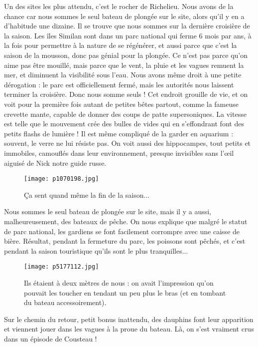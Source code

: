 \documentclass{book}
\begin{document}
Un des sites les plus attendu, c'est le rocher de Richelieu. Nous avons de la chance car nous sommes le seul bateau de plongée sur le site, alors qu'il y en a d'habitude une dizaine. Il se trouve que nous sommes sur la dernière croisière de la saison. Les îles Similan sont dans un parc national qui ferme 6 mois par ans, à la fois pour permettre à la nature de se régénérer, et aussi parce que c'est la saison de la mousson, donc pas génial pour la plongée. Ce n'est pas parce qu'on aime pas être mouillé, mais parce que le vent, la pluie et les vagues remuent la mer, et diminuent la visibilité sous l'eau. Nous avons même droit à une petite dérogation : le parc est officiellement fermé, mais les autorités nous laissent terminer la croisière. Donc nous somme seuls ! Cet endroit grouille de vie, et on voit pour la première fois autant de petites bêtes partout, comme la fameuse crevette mante, capable de donner des coups de patte supersoniques. La vitesse est telle que le mouvement crée des bulles de vides qui en s'effondrant font des petits flashs de lumière ! Il est même compliqué de la garder en aquarium : souvent, le verre ne lui résiste pas. On voit aussi des hippocampes, tout petits et immobiles, camouflés dans leur environnement, presque invisibles sans l’œil aiguisé de Nick notre guide russe.


\begin{figure}[h]
\centering
\texttt{[image: p1070198.jpg]}
\caption*{Ça sent quand même la fin de la saison...}
\end{figure}

Nous sommes le seul bateau de plongée sur le site, mais il y a aussi, malheureusement, des bateaux de pêche. On nous explique que malgré le statut de parc national, les gardiens se font facilement corrompre avec une caisse de bière. Résultat, pendant la fermeture du parc, les poissons sont pêchés, et c'est pendant la saison touristique qu'ils sont le plus tranquilles...


\begin{figure}[h]
\centering
\texttt{[image: p5177112.jpg]}
\caption*{Ils étaient à deux mètres de nous : on avait l'impression qu'on pouvait les toucher en tendant un peu plus le bras (et en tombant du bateau accessoirement).}
\end{figure}

Sur le chemin du retour, petit bonus inattendu, des dauphins font leur apparition et viennent jouer dans les vagues à la proue du bateau. Là, on s'est vraiment crus dans un épisode de Cousteau !
\end{document}
